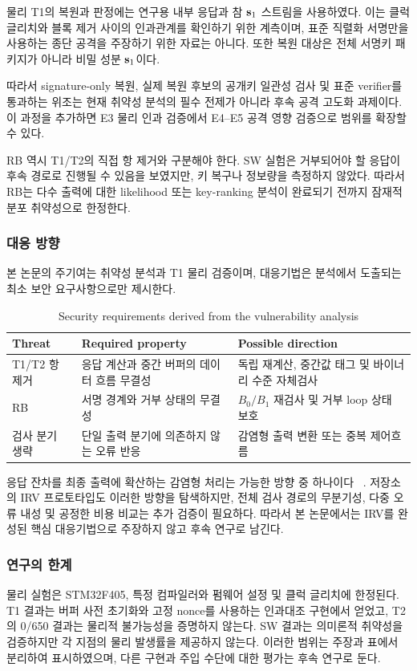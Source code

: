 물리 T1의 복원과 판정에는 연구용 내부 응답과 참 $\mathbf{s}_1$ 스트림을
사용하였다. 이는 클럭 글리치와 블록 제거 사이의 인과관계를 확인하기
위한 계측이며, 표준 직렬화 서명만을 사용하는 종단 공격을 주장하기
위한 자료는 아니다. 또한 복원 대상은 전체 서명키 패키지가 아니라
비밀 성분 $\mathbf{s}_1$이다.

따라서 signature-only 복원, 실제 복원 후보의 공개키 일관성 검사 및
표준 verifier를 통과하는 위조는 현재 취약성 분석의 필수 전제가 아니라
후속 공격 고도화 과제이다. 이 과정을 추가하면 E3 물리 인과 검증에서
E4--E5 공격 영향 검증으로 범위를 확장할 수 있다.

RB 역시 T1/T2의 직접 항 제거와 구분해야 한다. SW 실험은 거부되어야
할 응답이 후속 경로로 진행될 수 있음을 보였지만, 키 복구나 정보량을
측정하지 않았다. 따라서 RB는 다수 출력에 대한 likelihood 또는
key-ranking 분석이 완료되기 전까지 잠재적 분포 취약성으로 한정한다.

\subsubsection{대응 방향}

본 논문의 주기여는 취약성 분석과 T1 물리 검증이며, 대응기법은 분석에서
도출되는 최소 보안 요구사항으로만 제시한다.

\begin{table}[t]
\centering
\caption{Security requirements derived from the vulnerability analysis}
\label{tab:defense-requirement}
\small
\begin{tabularx}{0.94\textwidth}{@{}l X X@{}}
\toprule
Threat & Required property & Possible direction \\
\midrule
T1/T2 항 제거 &
응답 계산과 중간 버퍼의 데이터 흐름 무결성 &
독립 재계산, 중간값 태그 및 바이너리 수준 자체검사 \\
RB &
서명 경계와 거부 상태의 무결성 &
$B_0/B_1$ 재검사 및 거부 loop 상태 보호 \\
검사 분기 생략 &
단일 출력 분기에 의존하지 않는 오류 반응 &
감염형 출력 변환 또는 중복 제어흐름 \\
\bottomrule
\end{tabularx}
\end{table}

응답 잔차를 최종 출력에 확산하는 감염형 처리는 가능한 방향 중 하나이다
~\cite{yen2000,seo2013}. 저장소의 IRV 프로토타입도 이러한 방향을
탐색하지만, 전체 검사 경로의 무분기성, 다중 오류 내성 및 공정한 비용
비교는 추가 검증이 필요하다. 따라서 본 논문에서는 IRV를 완성된 핵심
대응기법으로 주장하지 않고 후속 연구로 남긴다.

\subsubsection{연구의 한계}

물리 실험은 STM32F405, 특정 컴파일러와 펌웨어 설정 및 클럭 글리치에
한정된다. T1 결과는 버퍼 사전 초기화와 고정 nonce를 사용하는
인과대조 구현에서 얻었고, T2의 0/650 결과는 물리적 불가능성을
증명하지 않는다. SW 결과는 의미론적 취약성을 검증하지만 각 지점의
물리 발생률을 제공하지 않는다. 이러한 범위는 주장과 표에서 분리하여
표시하였으며, 다른 구현과 주입 수단에 대한 평가는 후속 연구로 둔다.
